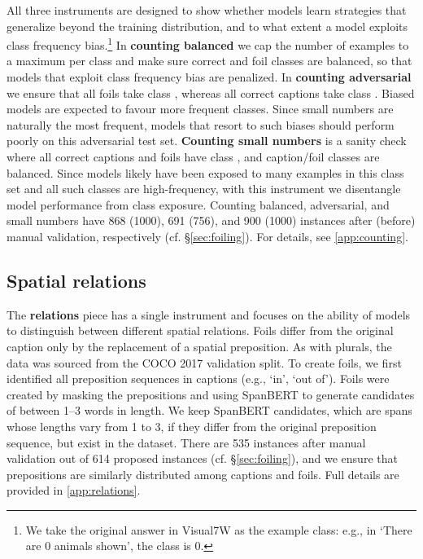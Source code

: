 \documentclass[11pt]{article}
\begin{document}
All three instruments are designed to show whether models learn strategies that generalize beyond the training distribution, and to what extent a model exploits class frequency bias.\footnote{We take the original answer in Visual7W as the example class: e.g., in `There are 0 animals shown', the class is 0.}
In {\bf counting balanced} we cap the number of examples to a maximum per class and make sure correct and foil classes are balanced, so that models that exploit class frequency bias are penalized.
In {\bf counting adversarial} we ensure that all foils take class , whereas all correct captions take class . Biased models are expected to favour more frequent classes.
Since small numbers are naturally the most frequent, models that resort to such biases should perform poorly on this 
adversarial test set.
{\bf Counting small numbers} is a sanity check where all correct captions and foils have class , and caption/foil classes are balanced. Since models likely have been exposed to many examples in this class set and all such classes are high-frequency, with this instrument we disentangle model performance from class exposure.
Counting balanced, adversarial, and small numbers have 868 (1000), 691 (756), and 900 (1000) instances after (before) manual validation, respectively (cf. \S \ref{sec:foiling}).
For details, see \ref{app:counting}.





\subsection{Spatial relations}
The \textbf{relations} piece has a single instrument and focuses on the ability of models to distinguish between different spatial relations. Foils differ from the original caption only by the replacement of a spatial preposition. 
As with plurals, the data
was sourced from the COCO 2017 validation split. To create foils, we first identified all
preposition sequences in captions (e.g., `in', `out of'). Foils were created 
by masking the prepositions and using  SpanBERT \cite{joshi-etal-2020-spanbert} to generate candidates of between 1--3 words in length. 
We keep SpanBERT candidates, which are spans whose lengths vary from 1 to 3, if they differ from the original preposition sequence, but exist in the dataset.
There are 535 instances after manual validation out of 614 proposed instances (cf. \S \ref{sec:foiling}),
and we ensure that prepositions are similarly distributed among captions and foils.
Full details are provided in \ref{app:relations}.
\end{document}
